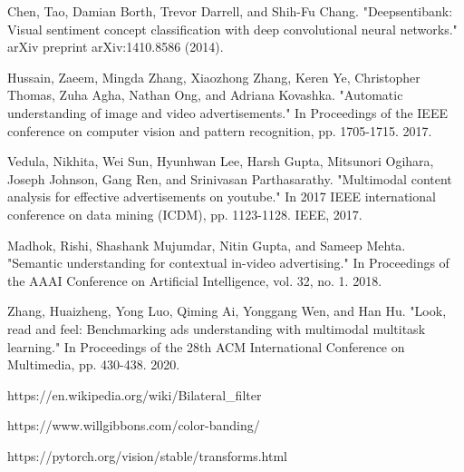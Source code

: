\documentclass[conference]{IEEEtran}
\begin{document}
\begin{thebibliography}{00}
 Chen, Tao, Damian Borth, Trevor Darrell, and Shih-Fu Chang. "Deepsentibank: Visual sentiment concept classification with deep convolutional neural networks." arXiv preprint arXiv:1410.8586 (2014).

 Hussain, Zaeem, Mingda Zhang, Xiaozhong Zhang, Keren Ye, Christopher Thomas, Zuha Agha, Nathan Ong, and Adriana Kovashka. "Automatic understanding of image and video advertisements." In Proceedings of the IEEE conference on computer vision and pattern recognition, pp. 1705-1715. 2017.

 Vedula, Nikhita, Wei Sun, Hyunhwan Lee, Harsh Gupta, Mitsunori Ogihara, Joseph Johnson, Gang Ren, and Srinivasan Parthasarathy. "Multimodal content analysis for effective advertisements on youtube." In 2017 IEEE international conference on data mining (ICDM), pp. 1123-1128. IEEE, 2017.

 Madhok, Rishi, Shashank Mujumdar, Nitin Gupta, and Sameep Mehta. "Semantic understanding for contextual in-video advertising." In Proceedings of the AAAI Conference on Artificial Intelligence, vol. 32, no. 1. 2018.

 Zhang, Huaizheng, Yong Luo, Qiming Ai, Yonggang Wen, and Han Hu. "Look, read and feel: Benchmarking ads understanding with multimodal multitask learning." In Proceedings of the 28th ACM International Conference on Multimedia, pp. 430-438. 2020.

 https://en.wikipedia.org/wiki/Bilateral\_filter

 https://www.willgibbons.com/color-banding/

 https://pytorch.org/vision/stable/transforms.html

\end{thebibliography}
\end{document}
